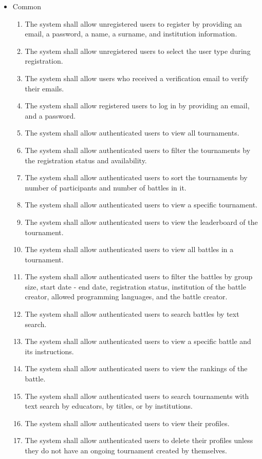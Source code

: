 \begin{itemize}
	\item Common
	\begin{enumerate}
		\item The system shall allow unregistered users to register by providing an email, a password, a name, a surname, and institution information.
            \item The system shall allow unregistered users to select the user type during registration.
  \item The system shall allow users who received a verification email to verify their emails.
  \item The system shall allow registered users to log in by providing an email, and a password.
  \item The system shall allow authenticated users to view all tournaments.
  \item The system shall allow authenticated users to filter the tournaments by the registration status and availability. 
  \item The system shall allow authenticated users to sort the tournaments by number of participants and number of battles in it.
  \item The system shall allow authenticated users to view a specific tournament.
  \item The system shall allow authenticated users to view the leaderboard of the tournament.
  \item The system shall allow authenticated users to view all battles in a tournament.
  \item The system shall allow authenticated users to filter the battles by group size, start date - end date, registration status, institution of the battle creator, allowed programming languages, and the battle creator.
  \item The system shall allow authenticated users to search battles by text search.
  \item The system shall allow authenticated users to view a specific battle and its instructions.
  \item The system shall allow authenticated users to view the rankings of the battle.
  \item The system shall allow authenticated users to search tournaments with text search by educators, by titles, or by institutions.
  \item The system shall allow authenticated users to view their profiles.
  \item The system shall allow authenticated users to delete their profiles unless they do not have an ongoing tournament created by themselves.

\end{enumerate}
\end{itemize}
